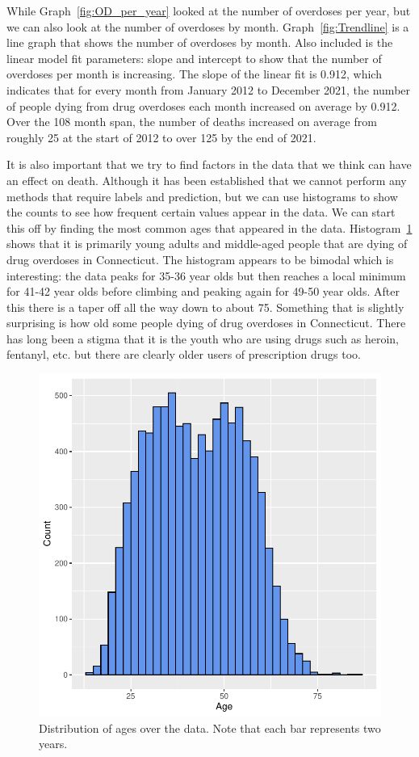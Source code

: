 \documentclass[12pt, letterpaper, titlepage]{article}
\begin{document}
While Graph~\ref{fig:OD_per_year} looked at the number of overdoses per year, but we can also look at the number of overdoses by month.  Graph~\ref{fig:Trendline} is a line graph that shows the number of overdoses by month.  Also included is the linear model fit parameters: slope and intercept to show that the number of overdoses per month is increasing.  The slope of the linear fit is 0.912, which indicates that for every month from January 2012 to December 2021, the number of people dying from drug overdoses each month increased on average by 0.912.  Over the 108 month span, the number of deaths increased on average from roughly 25 at the start of 2012 to over 125 by the end of 2021.

It is also important that we try to find factors in the data that we think can have an effect on death.  Although it has been established that we cannot perform any methods that require labels and prediction, but we can use histograms to show the counts to see how frequent certain values appear in the data.  We can start this off by finding the most common ages that appeared in the data.  Histogram~\ref{fig:AgeHist} shows that it is primarily young adults and middle-aged people that are dying of drug overdoses in Connecticut.  The histogram appears to be bimodal which is interesting: the data peaks for 35-36 year olds but then reaches a local minimum for 41-42 year olds before climbing and peaking again for 49-50 year olds.  After this there is a taper off all the way down to about 75.  Something that is slightly surprising is how old some people dying of drug overdoses in Connecticut.  There has long been a stigma that it is the youth who are using drugs such as heroin, fentanyl, etc. but there are clearly older users of prescription drugs too.

\begin{figure}[tbp]
    \centering
    \includegraphics{MoneyHistogram}
    \caption{Distribution of ages over the data. Note that each bar represents two years.}
    \label{fig:AgeHist}
  \end{figure}
\end{document}
